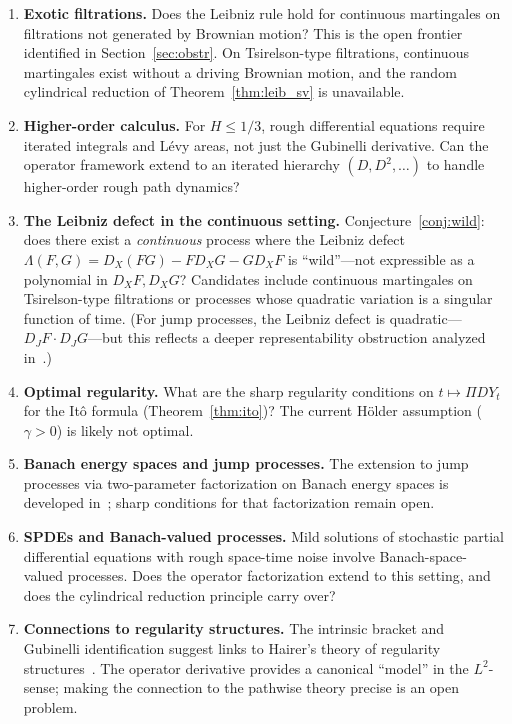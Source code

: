 \documentclass[11pt,a4paper]{article}
\theoremstyle{plain}
\theoremstyle{definition}
\theoremstyle{remark}
\begin{document}
\begin{enumerate}[label=\textbf{\arabic*.}, leftmargin=2em]

\item \textbf{Exotic filtrations.} Does the Leibniz rule hold for continuous martingales on filtrations not generated by Brownian motion? This is the open frontier identified in Section~\ref{sec:obstr}. On Tsirelson-type filtrations, continuous martingales exist without a driving Brownian motion, and the random cylindrical reduction of Theorem~\ref{thm:leib_sv} is unavailable.

\item \textbf{Higher-order calculus.} For $H \le 1/3$, rough differential equations require iterated integrals and L\'evy areas, not just the Gubinelli derivative. Can the operator framework extend to an iterated hierarchy $(D, D^2, \ldots)$ to handle higher-order rough path dynamics?

\item \textbf{The Leibniz defect in the continuous setting.} Conjecture~\ref{conj:wild}: does there exist a \emph{continuous} process where the Leibniz defect $\Lambda(F,G) = D_X(FG) - FD_XG - GD_XF$ is ``wild''---not expressible as a polynomial in $D_XF, D_XG$? Candidates include continuous martingales on Tsirelson-type filtrations or processes whose quadratic variation is a singular function of time. (For jump processes, the Leibniz defect is quadratic---$D_JF \cdot D_JG$---but this reflects a deeper representability obstruction analyzed in~\cite{Fontes2026Banach}.)

\item \textbf{Optimal regularity.} What are the sharp regularity conditions on $t \mapsto \Pi DY_t$ for the It\^o formula (Theorem~\ref{thm:ito})? The current H\"older assumption ($\gamma > 0$) is likely not optimal.

\item \textbf{Banach energy spaces and jump processes.} The extension to jump processes via two-parameter factorization on Banach energy spaces is developed in~\cite{Fontes2026Banach}; sharp conditions for that factorization remain open.

\item \textbf{SPDEs and Banach-valued processes.} Mild solutions of stochastic partial differential equations with rough space-time noise involve Banach-space-valued processes. Does the operator factorization extend to this setting, and does the cylindrical reduction principle carry over?

\item \textbf{Connections to regularity structures.} The intrinsic bracket and Gubinelli identification suggest links to Hairer's theory of regularity structures~\cite{Hairer2014}. The operator derivative provides a canonical ``model'' in the $L^2$-sense; making the connection to the pathwise theory precise is an open problem.

\end{enumerate}
\end{document}

